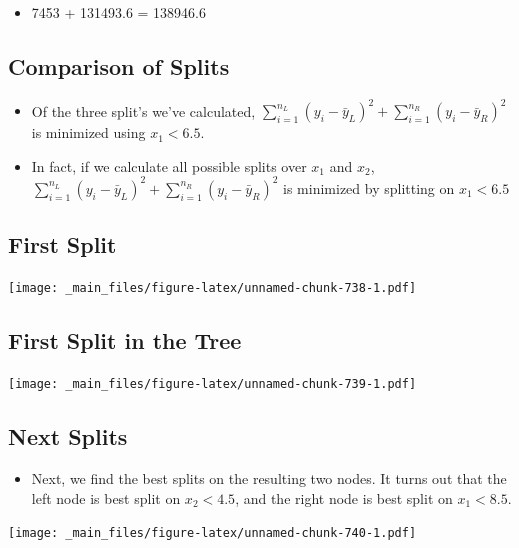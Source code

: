 \documentclass[]{book}
\providecommand{\tightlist}{%
  \setlength{\itemsep}{0pt}\setlength{\parskip}{0pt}}
\begin{document}
\begin{itemize}
\tightlist
\item
  7453 + 131493.6 = 138946.6
\end{itemize}

\subsection{Comparison of Splits}\label{comparison-of-splits}

\begin{itemize}
\item
  Of the three split's we've calculated,
  \(\displaystyle\sum_{i=1}^{n_L} (y_i -\bar{y}_L)^2 + \displaystyle\sum_{i=1}^{n_R} (y_i -\bar{y}_R)^2\)
  is minimized using \(x_1 < 6.5\).
\item
  In fact, if we calculate all possible splits over \(x_1\) and \(x_2\),
  \(\displaystyle\sum_{i=1}^{n_L} (y_i -\bar{y}_L)^2 + \displaystyle\sum_{i=1}^{n_R} (y_i -\bar{y}_R)^2\)
  is minimized by splitting on \(x_1 < 6.5\)
\end{itemize}

\subsection{First Split}\label{first-split}

\texttt{[image: \_main\_files/figure-latex/unnamed-chunk-738-1.pdf]}

\subsection{First Split in the Tree}\label{first-split-in-the-tree}

\texttt{[image: \_main\_files/figure-latex/unnamed-chunk-739-1.pdf]}

\subsection{Next Splits}\label{next-splits}

\begin{itemize}
\tightlist
\item
  Next, we find the best splits on the resulting two nodes. It turns out
  that the left node is best split on \(x_2 < 4.5\), and the right node
  is best split on \(x_1 < 8.5\).
\end{itemize}

\texttt{[image: \_main\_files/figure-latex/unnamed-chunk-740-1.pdf]}
\end{document}
